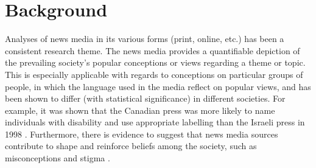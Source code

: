 \documentclass{report}
\begin{document}





\section{Background} \label{Background}  %

Analyses of news media in its various forms (print, online, etc.) has been a consistent research theme. 
The news media provides a quantifiable depiction of the prevailing society's popular conceptions or views regarding a theme or topic.
This is especially applicable with regards to conceptions on particular groups of people, in which the language used in the media reflect on popular views, and has been shown to differ (with statistical significance) in different societies.
For example, it was shown that the Canadian press was more likely to name individuals with disability and use appropriate labelling than the Israeli press in 1998 \cite{gold1999media}.
Furthermore, there is evidence to suggest that news media sources contribute to shape and reinforce beliefs among the society, such as misconceptions and stigma \cite{wahl1992mass}.
\end{document}
